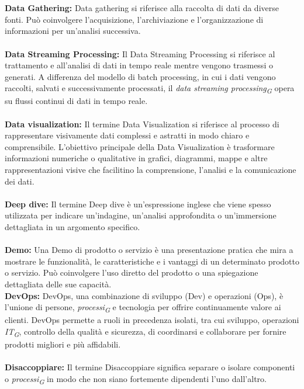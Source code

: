 \documentclass{article}
\begin{document}
\\
\\
\textbf{Data Gathering:} Data gathering si riferisce alla raccolta di dati da diverse fonti. Può coinvolgere l'acquisizione, l'archiviazione e l'organizzazione di informazioni per un'analisi successiva.
\\
\\
\textbf{Data Streaming Processing:} Il Data Streaming Processing si riferisce al trattamento e all'analisi di dati in tempo reale mentre vengono trasmessi o generati. A differenza del modello di batch processing, in cui i dati vengono raccolti, salvati e successivamente processati, il \textit{data streaming processing}\textsubscript{\textit{G}} opera su flussi continui di dati in tempo reale.
\\
\\
\textbf{Data visualization:} Il termine Data Visualization si riferisce al processo di rappresentare visivamente dati complessi e astratti in modo chiaro e comprensibile. L'obiettivo principale della Data Visualization è trasformare informazioni numeriche o qualitative in grafici, diagrammi, mappe e altre rappresentazioni visive che facilitino la comprensione, l'analisi e la comunicazione dei dati. 
\\
\\
\textbf{Deep dive:} Il termine Deep dive è un'espressione inglese che viene spesso utilizzata per indicare un'indagine, un'analisi approfondita o un'immersione dettagliata in un argomento specifico.
\\
\\
\textbf{Demo:} Una Demo di prodotto o servizio è una presentazione pratica che mira a mostrare le funzionalità, le caratteristiche e i vantaggi di un determinato prodotto o servizio. Può coinvolgere l'uso diretto del prodotto o una spiegazione dettagliata delle sue capacità.
\pagebreak
\\
\textbf{DevOps:} DevOps, una combinazione di sviluppo (Dev) e operazioni (Ops), è l'unione di persone, \textit{processi}\textsubscript{\textit{G}} e tecnologia per offrire continuamente valore ai clienti. DevOps permette a ruoli in precedenza isolati, tra cui sviluppo, operazioni \textit{IT}\textsubscript{\textit{G}}, controllo della qualità e sicurezza, di coordinarsi e collaborare per fornire prodotti migliori e più affidabili.
\\
\\
\textbf{Disaccoppiare:} Il termine Disaccoppiare significa separare o isolare componenti o \textit{processi}\textsubscript{\textit{G}} in modo che non siano fortemente dipendenti l'uno dall'altro.
\end{document}
